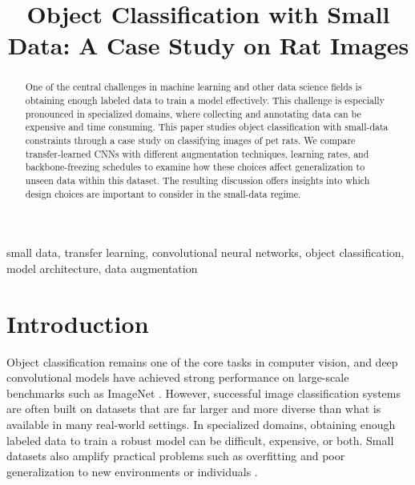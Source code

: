 \documentclass[conference]{IEEEtran}
\begin{document}
\title{Object Classification with Small Data: A Case Study on Rat Images}

\author{
}

\maketitle

\begin{abstract}
    One of the central challenges in machine learning and other data science fields is obtaining enough labeled data to train a model effectively. This challenge is especially pronounced in specialized domains, where collecting and annotating data can be expensive and time consuming. This paper studies object classification with small-data constraints through a case study on classifying images of pet rats. We compare transfer-learned CNNs with different augmentation techniques, learning rates, and backbone-freezing schedules to examine how these choices affect generalization to unseen data within this dataset. The resulting discussion offers insights into which design choices are important to consider in the small-data regime.
\end{abstract}

\begin{IEEEkeywords}
small data, transfer learning, convolutional neural networks, object classification, model architecture, data augmentation
\end{IEEEkeywords}

\section{Introduction}
Object classification remains one of the core tasks in computer vision, and deep convolutional models have achieved strong performance on large-scale benchmarks such as ImageNet \cite{deng2009imagenet, krizhevsky2012imagenet}. However, successful image classification systems are often built on datasets that are far larger and more diverse than what is available in many real-world settings. In specialized domains, obtaining enough labeled data to train a robust model can be difficult, expensive, or both. Small datasets also amplify practical problems such as overfitting and poor generalization to new environments or individuals \cite{goodfellow2016deep}.
\end{document}

